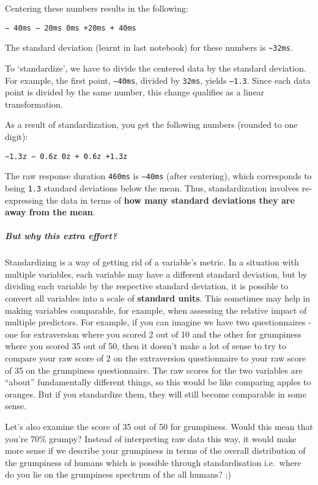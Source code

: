 \documentclass[
]{article}
\begin{document}
Centering these numbers results in the following:

\texttt{−\ 40ms\ −\ 20ms\ 0ms\ +20ms\ +\ 40ms}

The standard deviation (learnt in last notebook) for these numbers is
\texttt{\textasciitilde{}32ms}.

To `standardize', we have to divide the centered data by the standard
deviation. For example, the first point, \texttt{–40ms}, divided by
\texttt{32ms}, yields \texttt{–1.3}. Since each data point is divided by
the same number, this change qualifies as a linear transformation.

As a result of standardization, you get the following numbers (rounded
to one digit):

\texttt{−1.3z\ −\ 0.6z\ 0z\ +\ 0.6z\ +1.3z}

The raw response duration \texttt{460ms} is \texttt{–40ms} (after
centering), which corresponds to being \texttt{1.3} standard deviations
below the mean. Thus, standardization involves re-expressing the data in
terms of \textbf{how many standard deviations they are away from the
mean}.

\subparagraph{But why this extra
effort?}\label{but-why-this-extra-effort}

Standardizing is a way of getting rid of a variable's metric. In a
situation with multiple variables, each variable may have a different
standard deviation, but by dividing each variable by the respective
standard deviation, it is possible to convert all variables into a scale
of \textbf{standard units}. This sometimes may help in making variables
comparable, for example, when assessing the relative impact of multiple
predictors. For example, if you can imagine we have two questionnaires -
one for extraversion where you scored 2 out of 10 and the other for
grumpiness where you scored 35 out of 50, then it doesn't make a lot of
sense to try to compare your raw score of 2 on the extraversion
questionnaire to your raw score of 35 on the grumpiness questionnaire.
The raw scores for the two variables are ``about'' fundamentally
different things, so this would be like comparing apples to oranges. But
if you standardize them, they will still become comparable in some
sense.

Let's also examine the score of 35 out of 50 for grumpiness. Would this
mean that you're 70\% grumpy? Instead of interpreting raw data this way,
it would make more sense if we describe your grumpiness in terms of the
overall distribution of the grumpiness of humans which is possible
through standardisation i.e.~where do you lie on the grumpiness spectrum
of the all humans? ;)
\end{document}
